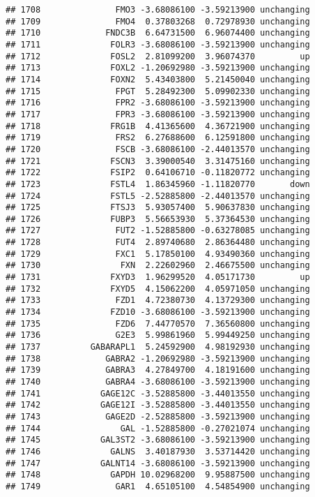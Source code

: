 \documentclass[]{article}
\begin{document}
\begin{verbatim}
## 1708               FMO3 -3.68086100 -3.59213900 unchanging
## 1709               FMO4  0.37803268  0.72978930 unchanging
## 1710             FNDC3B  6.64731500  6.96074400 unchanging
## 1711              FOLR3 -3.68086100 -3.59213900 unchanging
## 1712              FOSL2  2.81099200  3.96074370         up
## 1713              FOXL2 -1.20692980 -3.59213900 unchanging
## 1714              FOXN2  5.43403800  5.21450040 unchanging
## 1715               FPGT  5.28492300  5.09902330 unchanging
## 1716               FPR2 -3.68086100 -3.59213900 unchanging
## 1717               FPR3 -3.68086100 -3.59213900 unchanging
## 1718              FRG1B  4.41365600  4.36721900 unchanging
## 1719               FRS2  6.27688600  6.12591800 unchanging
## 1720               FSCB -3.68086100 -2.44013570 unchanging
## 1721              FSCN3  3.39000540  3.31475160 unchanging
## 1722              FSIP2  0.64106710 -0.11820772 unchanging
## 1723              FSTL4  1.86345960 -1.11820770       down
## 1724              FSTL5 -2.52885800 -2.44013570 unchanging
## 1725              FTSJ3  5.93057400  5.90637830 unchanging
## 1726              FUBP3  5.56653930  5.37364530 unchanging
## 1727               FUT2 -1.52885800 -0.63278085 unchanging
## 1728               FUT4  2.89740680  2.86364480 unchanging
## 1729               FXC1  5.17850100  4.93490360 unchanging
## 1730                FXN  2.22602960  2.46675500 unchanging
## 1731              FXYD3  1.96299520  4.05171730         up
## 1732              FXYD5  4.15062200  4.05971050 unchanging
## 1733               FZD1  4.72380730  4.13729300 unchanging
## 1734              FZD10 -3.68086100 -3.59213900 unchanging
## 1735               FZD6  7.44770570  7.36560800 unchanging
## 1736               G2E3  5.99861960  5.99449250 unchanging
## 1737          GABARAPL1  5.24592900  4.98192930 unchanging
## 1738             GABRA2 -1.20692980 -3.59213900 unchanging
## 1739             GABRA3  4.27849700  4.18191600 unchanging
## 1740             GABRA4 -3.68086100 -3.59213900 unchanging
## 1741            GAGE12C -3.52885800 -3.44013550 unchanging
## 1742            GAGE12I -3.52885800 -3.44013550 unchanging
## 1743             GAGE2D -2.52885800 -3.59213900 unchanging
## 1744                GAL -1.52885800 -0.27021074 unchanging
## 1745            GAL3ST2 -3.68086100 -3.59213900 unchanging
## 1746              GALNS  3.40187930  3.53714420 unchanging
## 1747            GALNT14 -3.68086100 -3.59213900 unchanging
## 1748              GAPDH 10.02968200  9.95887500 unchanging
## 1749               GAR1  4.65105100  4.54854900 unchanging

\end{verbatim}
\end{document}
